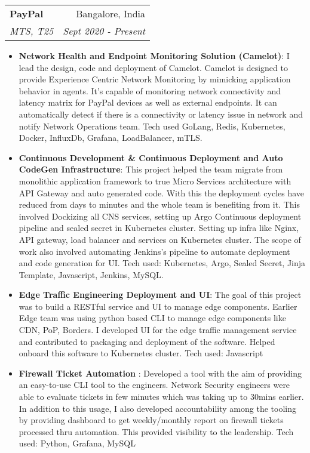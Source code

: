 \documentclass[letterpaper,11pt]{article}
\makeatletter
\newcommand{\resumeItem}[2]{
  \item\small{
    \textbf{#1}{: #2 \vspace{-2pt}}
  }
}
\newcommand{\resumeSubheading}[4]{
  \vspace{-1pt}\item
    \begin{tabular*}{0.97\textwidth}[t]{l@{\extracolsep{\fill}}r}
      \textbf{#1} & #2 \\
      \textit{\small#3} & \textit{\small #4} \\
    \end{tabular*}\vspace{-5pt}
}
\newcommand{\resumeSubSubheading}[2]{
    \begin{tabular*}{0.97\textwidth}{l@{\extracolsep{\fill}}r}
      \textit{\small#1} & \textit{\small #2} \\
    \end{tabular*}\vspace{-5pt}
}
\newcommand{\resumeSubHeadingListEnd}{\end{itemize}}
\newcommand{\resumeItemListStart}{\begin{itemize}}
\newcommand{\resumeItemListEnd}{\end{itemize}\vspace{-5pt}}
\makeatother
\begin{document}
    \resumeSubheading
      {PayPal}{Bangalore, India}
      {MTS, T25}{Sept 2020 - Present}
      \resumeItemListStart
        \resumeItem{Network Health and Endpoint Monitoring Solution (Camelot)}
          {I lead the design, code and deployment of Camelot. Camelot is designed to provide Experience Centric Network Monitoring by mimicking application behavior in agents. It’s capable of monitoring network connectivity and latency matrix for PayPal devices as well as external endpoints. It can automatically detect if there is a connectivity or latency issue in network and notify Network Operations team. Tech used GoLang, Redis, Kubernetes, Docker, InfluxDb, Grafana, LoadBalancer, mTLS.}
        \resumeItem{Continuous Development \& Continuous Deployment and Auto CodeGen Infrastructure}
          {This project helped the team migrate from monolithic application framework to true Micro Services architecture with API Gateway and auto generated code. With this the deployment cycles have reduced from days to minutes and the whole team is benefiting from it. This involved Dockizing all CNS services, setting up Argo Continuous deployment pipeline and sealed secret in Kubernetes cluster. Setting up infra like Nginx, API gateway, load balancer and services on Kubernetes cluster. The scope of work also involved automating Jenkins’s pipeline to automate deployment and code generation for UI. Tech used: Kubernetes, Argo, Sealed Secret, Jinja Template, Javascript, Jenkins, MySQL. }
        \resumeItem{Edge Traffic Engineering Deployment and UI}
          {The goal of this project was to build a RESTful service and UI to manage edge components. Earlier Edge team was using python based CLI to manage edge components like CDN, PoP, Borders. I developed UI for the edge traffic management service and contributed to packaging and deployment of the software. Helped onboard this software to Kubernetes cluster. Tech used: Javascript}
        \resumeItem{Firewall Ticket Automation }
          {Developed a tool with the aim of providing an easy-to-use CLI tool to the engineers. Network Security engineers were able to evaluate tickets in few minutes which was taking up to 30mins earlier. In addition to this usage, I also developed accountability among the tooling by providing dashboard to get weekly/monthly report on firewall tickets processed thru automation. This provided visibility to the leadership. Tech used: Python, Grafana, MySQL}
      \resumeItemListEnd
      
\end{document}

